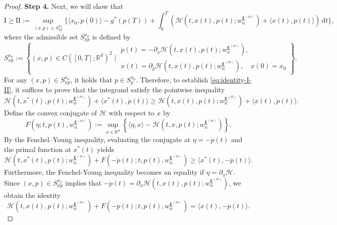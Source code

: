 \documentclass[10pt,a4paper]{amsart}
\newcommand{\R}{\mathbb{R}}
\newcommand{\dd}{\mathrm{d}}
\begin{document}
\begin{proof}
{\bf Step 4.} Next, we will show that 
\begin{equation} \label{eq:identity-I-II}
    \textrm{I} \ge \textrm{II} := \sup_{(x,p)\in S_{xp}^{x_0}} \bigg\{\langle x_0, p(0) \rangle - g^*(p(T)) + \int_0^T \left(\mathcal{H}(t,x(t), p(t); w_n^{\bm{\xi}^{(m)}}) + \langle x(t), \dot{p}(t) \rangle\right) \,\dd t \bigg\}, 
\end{equation}
where the admissible set $S_{xp}^{x_0}$ is defined by 
\begin{equation*}
    S_{xp}^{x_0} := \left\{
(x,p)\in C([0,T]; \mathbb{R}^d)^2 \;\bigg|\;
\begin{array}{l}\dot{p}(t) = -\partial_x \mathcal{H}(t,x(t), p(t); w_n^{\bm{\xi}^{(m)}}), \\
\dot{x}(t) = \partial_p\mathcal{H}(t,x(t), p(t); w_n^{\bm{\xi}^{(m)}}),\quad x(0) = x_0
\end{array}\right\}. 
\end{equation*}
For any $(x, p) \in S_{xp}^{x_0}$, it holds that $p\in S_p^{x_0}$. Therefore, to establish \eqref{eq:identity-I-II}, it suffices to prove that the integrand satisfy the pointwise inequality 
\begin{equation} \label{eq:goal-ineq}
    \mathcal{H}(t, x^*(t), p(t); w_n^{\bm{\xi}^{(m)}}) + \langle x^*(t), \dot{p}(t)\rangle \ge \mathcal{H}(t,x(t), p(t); w_n^{\bm{\xi}^{(m)}}) + \langle x(t), \dot{p}(t) \rangle. 
\end{equation}
Define the convex conjugate of $\mathcal{H}$ with respect to $x$ by 
\begin{equation*}
    F(\eta; t, p(t), w_n^{\bm{\xi}^{(m)}}) := \sup_{x\in \R^d} \left\{ \langle \eta, x\rangle - \mathcal{H}(t, x, p(t); w_n^{\bm{\xi}^{(m)}}) \right\}. 
\end{equation*}
By the Fenchel–Young inequality, evaluating the conjugate at $\eta = -\dot{p}(t)$ and the primal function at $x^*(t)$ yields 
\begin{equation} \label{eq:FY-1}
    \mathcal{H}(t, x^*(t), p(t); w_n^{\bm{\xi}^{(m)}}) + F(-\dot{p}(t); t, p(t), w_n^{\bm{\xi}^{(m)}}) \ge \langle x^*(t), -\dot{p}(t)\rangle. 
\end{equation}
Furthermore, the Fenchel-Young inequality becomes an equality if $\eta = \partial_x\mathcal{H}$. Since $(x, p) \in S_{xp}^{x_0}$ implies that $-\dot{p}(t) = \partial_x\mathcal{H}(t, x(t), p(t); w_n^{\bm{\xi}^{(m)}})$, we obtain the identity 
\begin{equation} \label{eq:FY-2}
    \mathcal{H}(t, x(t), p(t); w_n^{\bm{\xi}^{(m)}}) + F(-\dot{p}(t); t, p(t), w_n^{\bm{\xi}^{(m)}}) = \langle x(t), -\dot{p}(t)\rangle. 

\end{equation}
\end{proof}
\end{document}

